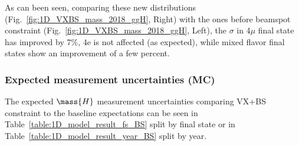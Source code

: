 As can been seen, comparing these new distributions (Fig.~\ref{fig:1D_VXBS_mass_2018_ggH}, Right) with the ones before beamspot constraint (Fig.~\ref{fig:1D_VXBS_mass_2018_ggH}, Left), the $\sigma$ in 4$\mu$ final state has improved by 7$\%$, 4e is not affected (as expected), while mixed flavor final states show an improvement of a few percent.

\subsubsection{Expected \mH measurement uncertainties (MC)}
The expected $\mass{H}$ measurement uncertainties comparing VX+BS constraint to the baseline expectations can be seen in Table~\ref{table:1D_model_result_fs_BS} split by final state or in Table~\ref{table:1D_model_result_year_BS} split by year.

